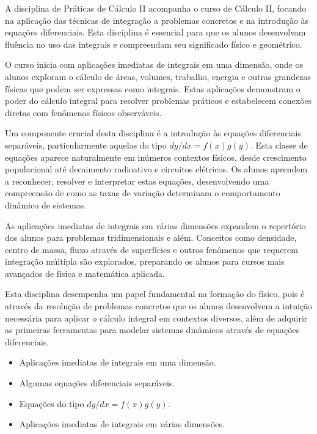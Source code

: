 \documentclass[a4paper, 12pt]{article}
\newcounter{mat}
\begin{document}
A disciplina de Práticas de Cálculo II acompanha o curso de Cálculo II, focando na
aplicação das técnicas de integração a problemas concretos e na introdução às equações
diferenciais. Esta disciplina é essencial para que os alunos desenvolvam fluência no
uso das integrais e compreendam seu significado físico e geométrico.

O curso inicia com aplicações imediatas de integrais em uma dimensão, onde os alunos
exploram o cálculo de áreas, volumes, trabalho, energia e outras grandezas físicas que
podem ser expressas como integrais. Estas aplicações demonstram o poder do cálculo
integral para resolver problemas práticos e estabelecem conexões diretas com fenômenos
físicos observáveis.

Um componente crucial desta disciplina é a introdução às equações diferenciais
separáveis, particularmente aquelas do tipo $dy/dx = f(x)g(y)$. Esta classe de equações
aparece naturalmente em inúmeros contextos físicos, desde crescimento populacional até
decaimento radioativo e circuitos elétricos. Os alunos aprendem a reconhecer, resolver
e interpretar estas equações, desenvolvendo uma compreensão de como as taxas de
variação determinam o comportamento dinâmico de sistemas.

As aplicações imediatas de integrais em várias dimensões expandem o repertório dos
alunos para problemas tridimensionais e além. Conceitos como densidade, centro de
massa, fluxo através de superfícies e outros fenômenos que requerem integração múltipla
são explorados, preparando os alunos para cursos mais avançados de física e matemática
aplicada.

Esta disciplina desempenha um papel fundamental na formação do físico, pois é através
da resolução de problemas concretos que os alunos desenvolvem a intuição necessária
para aplicar o cálculo integral em contextos diversos, além de adquirir as primeiras
ferramentas para modelar sistemas dinâmicos através de equações diferenciais.

\begin{tcolorbox}[title=Ementa:]
    \begin{itemize}
        \item Aplicações imediatas de integrais em uma dimensão.
        \item Algumas equações diferenciais separáveis.
        \item Equações do tipo $dy/dx=f(x)g(y)$.
        \item Aplicações imediatas de integrais em várias dimensões.
    \end{itemize}
\end{tcolorbox}
\end{document}
